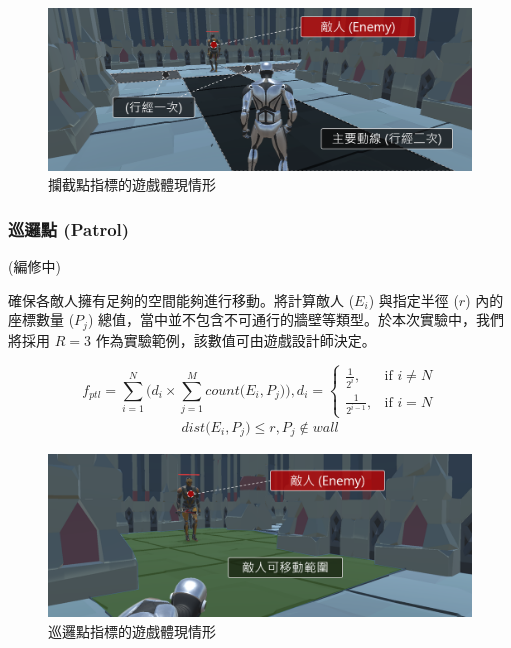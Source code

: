 \begin{figure}[ht]
  \begin{center}
    \includegraphics[width=1.0\textwidth]{figures/fitnesses-intercept-gameplay.png}
    \caption{攔截點指標的遊戲體現情形}
    \label{fig:fitnesses-intercept-gameplay}
  \end{center}
\end{figure}

\subsubsection{巡邏點 (Patrol)}
\label{sssec:method-segments-fitnesses-patrol}

(編修中)

確保各敵人擁有足夠的空間能夠進行移動。將計算敵人 ($E_{i}$) 與指定半徑 ($r$) 內的座標數量 ($P_j$) 總值，當中並不包含不可通行的牆壁等類型。於本次實驗中，我們將採用 $R=3$ 作為實驗範例，該數值可由遊戲設計師決定。

\begin{equation}
    f_{ptl} = \sum_{i=1}^{N} \Big( d_{i} \times \sum_{j=1}^{M} count\big(E_{i}, P_{j}\big) \Big), 
    d_{i} = \begin{cases}
                \frac{1}{2^{i}},   & \mbox{if } i \neq N \\
                \frac{1}{2^{i-1}}, & \mbox{if } i = N
            \end{cases}
\end{equation}
\begin{gather*}
    dist\big(E_{i}, P_{j}\big) \leq r,  P_{j} \notin wall
\end{gather*}

\begin{figure}[ht]
  \begin{center}
    \includegraphics[width=1.0\textwidth]{figures/fitnesses-patrol-gameplay.png}
    \caption{巡邏點指標的遊戲體現情形}
    \label{fig:fitnesses-patrol-gameplay}
  \end{center}
\end{figure}

